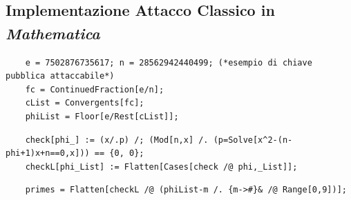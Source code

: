 \documentclass[twoside,symmetric,justified,openany,nobib]{tufte-book}
\begin{document}
% 
% 
\begin{tcolorbox}[enhanced, breakable, colback=white, colframe=white, check odd page, toggle left and right, grow to right by=\marginparwidth+\marginparsep, toggle enlargement=evenpage]
  \setlength{\parindent}{2ex}
  \section*{\normalfont\textbf{Implementazione Attacco Classico in \textit{Mathematica\textsuperscript{\textregistered}}}}
  \begin{lstlisting}
    e = 7502876735617; n = 28562942440499; (*esempio di chiave pubblica attaccabile*)
    fc = ContinuedFraction[e/n];
    cList = Convergents[fc];
    phiList = Floor[e/Rest[cList]];\end{lstlisting}
  \begin{lstlisting}
    check[phi_] := (x/.p) /; (Mod[n,x] /. (p=Solve[x^2-(n-phi+1)x+n==0,x])) == {0, 0};
    checkL[phi_List] := Flatten[Cases[check /@ phi,_List]];\end{lstlisting}
  \begin{lstlisting}
    primes = Flatten[checkL /@ (phiList-m /. {m->#}& /@ Range[0,9])];\end{lstlisting}
\end{tcolorbox}
\vspace{1.5cm}
\end{document}
